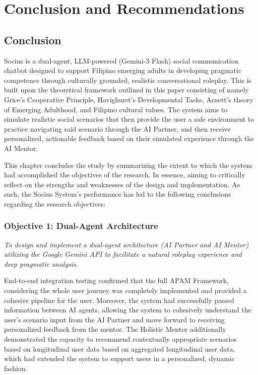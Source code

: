 \chapter{Conclusion and Recommendations}\label{chap:chapter7}

\section{Conclusion}\label{sec:conclusion}

Socius is a dual-agent, LLM-powered (Gemini-3 Flash) social communication chatbot designed to
support Filipino emerging adults in developing pragmatic competence through
culturally grounded, realistic conversational roleplay. This is built upon the theoretical framework outlined in this paper 
consisting of namely Grice's Cooperative Principle, Havighurst's Developmental Tasks, Arnett's theory of
Emerging Adulthood, and Filipino cultural values. The system aims to simulate 
realistic social scenarios that then provide the user a safe environment to practice
navigating said scenario through the AI Partner, and then receive personalized, actionable 
feedback based on their simulated experience through the AI Mentor.

This chapter concludes the study by summarizing the extent to which the system had accomplished
the objectives of the research. In essence, aiming to critically reflect on the strengths and weaknesses of the design and implementation.
As such, the Socius System's performance has led to the following conclusions regarding the research objectives:

\subsection*{Objective 1: Dual-Agent Architecture}

\textit{To design and implement a dual-agent architecture (AI Partner and AI Mentor)
utilizing the Google Gemini API to facilitate a natural roleplay experience and
deep pragmatic analysis.}


\medskip

End-to-end integration testing confirmed that the full APAM Framework, considering the whole user journey
was completely implemented and provided a cohesive pipeline for the user. Moreover, the system had successfully passed information
between AI agents, allowing the system to cohesively understand the user's scenario input from the AI Partner and move forward to 
receiving personalized feedback from the mentor. The Holistic Mentor additionally 
demonstrated the capacity to recommend contextually appropriate scenarios based on longitudinal user data based on aggregated longitudinal user data, 
which had extended the system to support users in a personalized, dynamic fashion.

